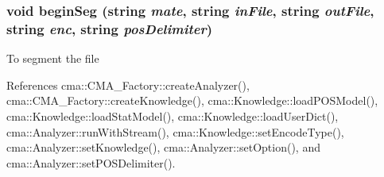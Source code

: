 \subsubsection[{beginSeg}]{\setlength{\rightskip}{0pt plus 5cm}void beginSeg (string {\em mate}, \/  string {\em inFile}, \/  string {\em outFile}, \/  string {\em enc}, \/  string {\em posDelimiter})}\label{SeggerCMD_8h_b30a0cc7bae3e3976cb797d3f026c20b}


To segment the file 

References cma::CMA\_\-Factory::createAnalyzer(), cma::CMA\_\-Factory::createKnowledge(), cma::Knowledge::loadPOSModel(), cma::Knowledge::loadStatModel(), cma::Knowledge::loadUserDict(), cma::Analyzer::runWithStream(), cma::Knowledge::setEncodeType(), cma::Analyzer::setKnowledge(), cma::Analyzer::setOption(), and cma::Analyzer::setPOSDelimiter().